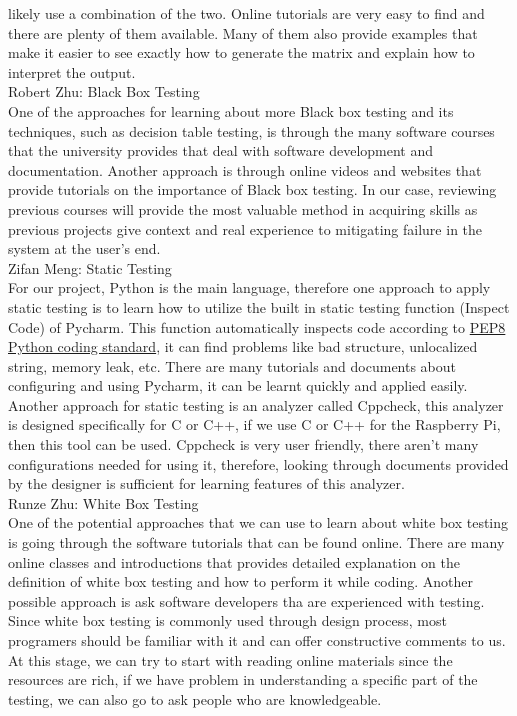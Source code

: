 \documentclass[12pt]{article}
\begin{document}
\begin{outline}[enumerate]
    likely use a combination of the two. Online tutorials are very easy to find and there are plenty of them available. Many of them also provide examples that make it 
    easier to see exactly how to generate the matrix and explain how to interpret the output.\\
    \2 Robert Zhu: Black Box Testing\\
    One of the approaches for learning about more Black box testing and its techniques, such as decision table testing, is through the many software courses that the university 
    provides that deal with software development and documentation. Another approach is through online videos and websites that provide tutorials on the importance of Black box testing. 
    In our case, reviewing previous courses will provide the most valuable method in acquiring skills as previous projects give context and real experience to mitigating failure in 
    the system at the user’s end.\\
    \2 Zifan Meng: Static Testing\\
    For our project, Python is the main language, therefore one approach to apply static testing is to learn how to utilize the built in static testing function (Inspect Code) of Pycharm. This function automatically inspects code according to \href{https://peps.python.org/pep-0008/}{PEP8 Python coding standard}, it can find problems like bad structure, unlocalized string, memory leak, etc. There are many tutorials and documents about configuring and using Pycharm, it can be learnt quickly and applied easily. Another approach for static testing is an analyzer called Cppcheck, this analyzer is designed specifically for C or C++, if we use C or C++ for the Raspberry Pi, then this tool can be used. Cppcheck is very user friendly, there aren’t many configurations needed for using it, therefore, looking through documents provided by the designer is sufficient for learning features of this analyzer.\\
    \2 Runze Zhu: White Box Testing\\
    One of the potential approaches that we can use to learn about white box testing is going through the software tutorials that can be found online. There are many online classes and introductions that provides detailed explanation on the definition of white box testing and how to perform it while coding. Another possible approach is ask software developers tha are experienced with testing. Since white box testing is commonly used through design process, most programers should be familiar with it and can offer constructive comments to us. At this stage, we can try to start with reading online materials since the resources are rich, if we have problem in understanding a specific part of the testing, we can also go to ask people who are knowledgeable.

  
\end{outline}
\end{document}
